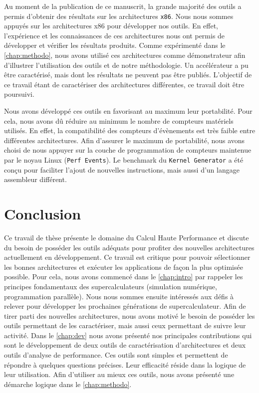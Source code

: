         
        Au moment de la publication de ce manuscrit, la grande majorité des outils a permis d'obtenir des résultats sur les architectures \verb|x86|. Nous nous sommes appuyés sur les architectures x86 pour développer nos outils. En effet, l'expérience et les connaissances de ces architectures nous ont permis de développer et vérifier les résultats produits. Comme expérimenté dans le \autoref{chap:methodo}, nous avons utilisé ces architectures comme démonstrateur afin d'illustrer l'utilisation des outils et de notre méthodologie. Un accélérateur a pu être caractérisé, mais dont les résultats ne peuvent pas être publiés. L'objectif de ce travail étant de caractériser des architectures différentes, ce travail doit être poursuivi. 
        
        Nous avons développé ces outils en favorisant au maximum leur portabilité. Pour cela, nous avons dû réduire au minimum le nombre de compteurs matériels utilisés. En effet, la compatibilité des compteurs d'évènements est très faible entre différentes architectures. Afin d'assurer le maximum de portabilité, nous avons choisi de nous appuyer sur la couche de programmation de compteurs maintenue par le noyau Linux (\verb|Perf Events|). Le benchmark du \verb|Kernel Generator| a été conçu pour faciliter l'ajout de nouvelles instructions, mais aussi d'un langage assembleur différent.


\section{Conclusion}
    
    Ce travail de thèse présente le domaine du Calcul Haute Performance et discute du besoin de posséder les outils adéquats pour profiter des nouvelles architectures actuellement en développement. Ce travail est critique pour pouvoir sélectionner les bonnes architectures et exécuter les applications de façon la plus optimisée possible.
    Pour cela, nous avons commencé dans le \autoref{chap:intro} par rappeler les principes fondamentaux des supercalculateurs (simulation numérique, programmation parallèle). Nous nous sommes ensuite intéressés aux défis à relever pour développer les prochaines générations de supercalculateur. Afin de tirer parti des nouvelles architectures, nous avons motivé le besoin de posséder les outils permettant de les caractériser, mais aussi ceux permettant de suivre leur activité. Dans le \autoref{chap:dev} nous avons présenté nos principales contributions qui sont le développement de deux outils de caractérisation d'architectures et deux outils d'analyse de performance. Ces outils sont simples et permettent de répondre à quelques questions précises. Leur efficacité réside dans la logique de leur utilisation. Afin d'utiliser au mieux ces outils, nous avons présenté une démarche logique dans le \autoref{chap:methodo}.
        
